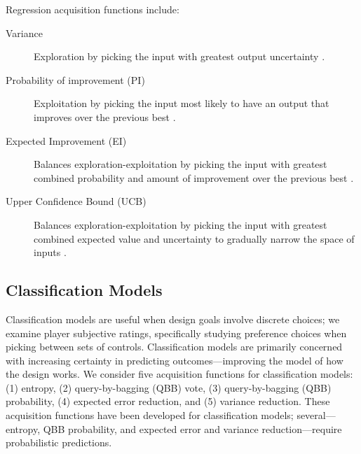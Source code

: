 \documentclass{sig-alternate}
\begin{document}
Regression acquisition functions include:
\begin{description}
%
\item[Variance] Exploration by picking the input with greatest output uncertainty \cite{brochu2010:thesis}.
%
\item[Probability of improvement (PI)] Exploitation by picking the input most likely to have an output that improves over the previous best \cite{brochu2010:thesis}.
%
\item[Expected Improvement (EI)] Balances exploration-exploitation by picking the input with greatest combined probability and amount of improvement over the previous best \cite{brochu2010:thesis}.
%
\item[Upper Confidence Bound (UCB)] Balances exploration-exploitation by picking the input with greatest combined expected value and uncertainty to gradually narrow the space of inputs \cite{srinivas2010:gp-ucb}.
\end{description}



\subsection{Classification Models}
Classification models are useful when design goals involve discrete choices; we examine player subjective ratings, specifically studying preference choices when picking between sets of controls.
Classification models are primarily concerned with increasing certainty in predicting outcomes---improving the model of how the design works.
We consider five acquisition functions for classification models: (1) entropy, (2) query-by-bagging (QBB) vote, (3) query-by-bagging (QBB) probability, (4) expected error reduction, and (5) variance reduction.
These acquisition functions have been developed for classification models; several---entropy, QBB probability, and expected error and variance reduction---require probabilistic predictions.
\end{document}
